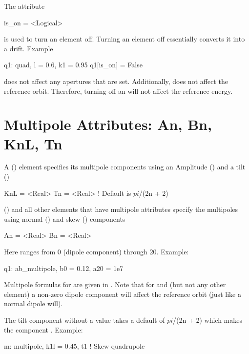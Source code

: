 The  attribute
\begin{example}
  is_on = <Logical>
\end{example}
is used to turn an element off. Turning
an element off essentially converts it into a drift.
Example
\begin{example}
  q1: quad, l = 0.6, k1 = 0.95
  q1[is_on] = False
\end{example}

 does not affect any apertures that are set. Additionally,
 does not affect the reference orbit. Therefore, turning 
off an  will not affect the reference energy.

\section{Multipole Attributes: An, Bn, KnL, Tn}
\label{s:multip}

A  () element specifies its multipole
components using an Amplitude () and a tilt ()
\begin{example}
  KnL = <Real>
  Tn  = <Real>  ! Default is $pi$/(2n + 2)
\end{example}
 () and all other elements that
have multipole attributes specify the multipoles using normal
() and skew () components 
\begin{example}
  An = <Real>
  Bn = <Real>
\end{example}
Here  ranges from 0
(dipole component) through 20. Example:
\begin{example}
  q1: ab_multipole, b0 = 0.12, a20 = 1e7
\end{example}

Multipole formulas for are given in .  Note that for
 and  (but not any other element) a
non-zero dipole component will affect the reference orbit (just like a
normal dipole will).

The  tilt component without a value takes a default of $pi$/(2n
+ 2) which makes the component .  Example:
\begin{example}
  m: multipole, k1l = 0.45, t1  ! Skew quadrupole
\end{example}

